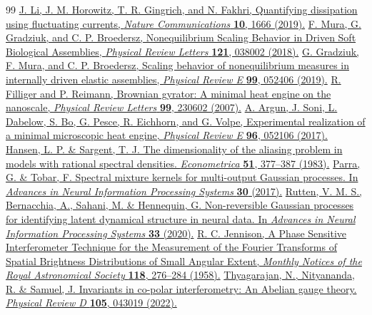\begin{thebibliography}{99}
 \href{https://doi.org/10.1038/s41467-019-09631-x}{J. Li, J. M. Horowitz, T. R. Gingrich, and N. Fakhri, Quantifying dissipation using fluctuating currents, \emph{Nature Communications} \textbf{10}, 1666 (2019).}
 \href{https://doi.org/10.1103/PhysRevLett.121.038002}{F. Mura, G. Gradziuk, and C. P. Broedersz, Nonequilibrium Scaling Behavior in Driven Soft Biological Assemblies, \emph{Physical Review Letters} \textbf{121}, 038002 (2018).}
 \href{https://doi.org/10.1103/PhysRevE.99.052406}{G. Gradziuk, F. Mura, and C. P. Broedersz, Scaling behavior of nonequilibrium measures in internally driven elastic assemblies, \emph{Physical Review E} \textbf{99}, 052406 (2019).}
 \href{https://doi.org/10.1103/PhysRevLett.99.230602}{R. Filliger and P. Reimann, Brownian gyrator: A minimal heat engine on the nanoscale, \emph{Physical Review Letters} \textbf{99}, 230602 (2007).}
 \href{https://doi.org/10.1103/PhysRevE.96.052106}{A. Argun, J. Soni, L. Dabelow, S. Bo, G. Pesce, R. Eichhorn, and G. Volpe, Experimental realization of a minimal microscopic heat engine, \emph{Physical Review E} \textbf{96}, 052106 (2017).}
 \href{https://doi.org/10.2307/1911996}{Hansen, L. P. \& Sargent, T. J. The dimensionality of the aliasing problem in models with rational spectral densities. \emph{Econometrica} \textbf{51}, 377--387 (1983).}
 \href{https://proceedings.neurips.cc/paper/2017/hash/333cb763facc6ce398ff83845f224d62-Abstract.html}{Parra, G. \& Tobar, F. Spectral mixture kernels for multi-output Gaussian processes. In \emph{Advances in Neural Information Processing Systems} \textbf{30} (2017).}
 \href{https://proceedings.neurips.cc/paper/2020/hash/6d79e030371e47e6231337805a7a2685-Abstract.html}{Rutten, V. M. S., Bernacchia, A., Sahani, M. \& Hennequin, G. Non-reversible Gaussian processes for identifying latent dynamical structure in neural data. In \emph{Advances in Neural Information Processing Systems} \textbf{33} (2020).}
 \href{https://doi.org/10.1093/mnras/118.3.276}{R. C. Jennison, A Phase Sensitive Interferometer Technique for the Measurement of the Fourier Transforms of Spatial Brightness Distributions of Small Angular Extent, \emph{Monthly Notices of the Royal Astronomical Society} \textbf{118}, 276--284 (1958).}
 \href{https://doi.org/10.1103/PhysRevD.105.043019}{Thyagarajan, N., Nityananda, R. \& Samuel, J. Invariants in co-polar interferometry: An Abelian gauge theory. \emph{Physical Review D} \textbf{105}, 043019 (2022).}

\end{thebibliography}
